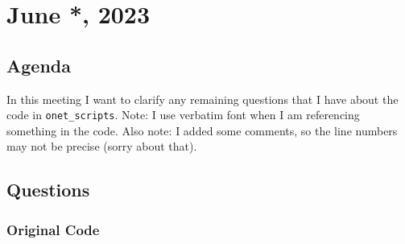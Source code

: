 \documentclass{article}
\begin{document}
\section*{June *, 2023}
\subsection*{Agenda}
In this meeting I want to clarify any remaining questions that I have about the code in \verb|onet_scripts|. Note: I use verbatim font when I am referencing something in the code. Also note: I added some comments, so the line numbers may not be precise (sorry about that).
\subsection*{Questions}
\subsubsection*{Original Code}
\end{document}
